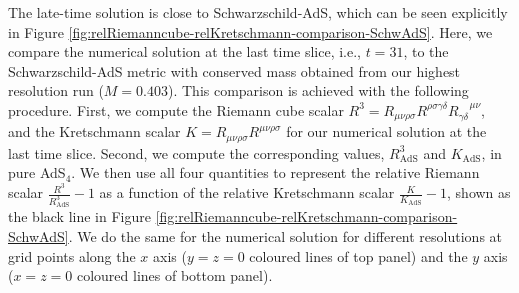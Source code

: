 \documentclass[a4paper,11pt]{article}
\numberwithin{equation}{section}
\begin{document}


The late-time solution is close to Schwarzschild-AdS, which can be seen explicitly in Figure \ref{fig:relRiemanncube-relKretschmann-comparison-SchwAdS}.
Here, we compare the numerical solution at the last time slice, i.e., $t=31$, to the Schwarzschild-AdS metric with conserved mass obtained from our highest resolution run ($M=0.403$).
This comparison is achieved with the following procedure.
First, we compute the Riemann cube scalar $R^3=R_{\mu\nu\rho\sigma}R^{\rho\sigma\gamma\delta}R_{\gamma\delta}^{\;\;\;\;\mu\nu}$, and the Kretschmann scalar $K=R_{\mu\nu\rho\sigma}R^{\mu\nu\rho\sigma}$ for our numerical solution at the last time slice. 
Second, we compute the corresponding values, $R^3_{\text{AdS}}$ and $K_{\text{AdS}}$, in pure AdS$_4$.
We then use all four quantities to represent the relative Riemann scalar $\frac{R^3}{R^3_{\text{AdS}}}-1$ as a function of the relative Kretschmann scalar $\frac{K}{K_{\text{AdS}}}-1$, shown as the black line in Figure \ref{fig:relRiemanncube-relKretschmann-comparison-SchwAdS}. 
We do the same for the numerical solution for different resolutions at grid points along the $x$ axis ($y=z=0$ coloured lines of top panel) and the $y$ axis ($x=z=0$ coloured lines of bottom panel). 
\end{document}
